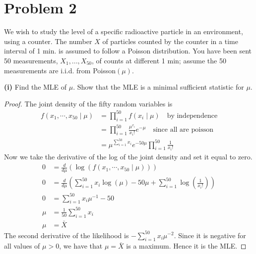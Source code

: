 \documentclass[letterpaper, 12pt]{article}\usepackage[]{graphicx}\usepackage[]{color}
\newcommand{\sbs}{\;|\;} %
\begin{document}
\section*{Problem 2} We wish to study the level of a specific radioactive particle in
an environment, using a counter. The number $X$ of particles counted by the
counter in a time interval of 1 min. is assumed to follow a Poisson
distribution. You have been sent 50 measurements, $X_{1},...,X_{50}$, of
counts at different 1 min; assume the 50 measurements are i.i.d. from
Poisson$(\mu )$.

\textbf{(i)}
Find the MLE of $\mu$. Show that the MLE is a minimal sufficient statistic for $\mu$.

\begin{proof}
The joint density of the fifty random variables is 
\begin{align*}
f(x_1, \cdots, x_{50} \sbs \mu) 
&= 
\prod_{i=1}^{50} 
f(x_i \sbs \mu) 
\quad \text{by independence} \\
&= 
\prod_{i=1}^{50}
\frac{\mu^{x_i}}{x_i!} e^{-\mu}
\quad \text{since all are poisson} \\
&= 
\mu^{\sum_{i=1}^{50} x_i} e ^{-50\mu} 
\prod_{i=1}^{50}
\frac{1}{x_i!}
\end{align*}
Now we take the derivative of the log of the joint density and set it equal to zero.
\begin{align*}
0 &= \frac{d}{d \mu}(\log (  f(x_1, \cdots, x_{50} \sbs \mu)   )) \\
0 &= 
\frac{d}{d \mu} 
\left(\sum_{i=1}^{50} x_i \log(\mu) - 50 \mu + \sum_{i=1}^{50} \log\left(\frac{1}{x_i!} \right)    \right) \\
0 &=
\sum_{i=1}^{50} x_i \mu^{-1} - 50 \\
\mu &= \frac{1}{50}\sum_{i=1}^{50} x_i \\
\mu &= \bar{X}
\end{align*}
The second derivative of the likelihood is $-\sum_{i=1}^{50} x_i \mu^{-2}$. Since it is negative for all values of $\mu > 0$, we have that $\mu = \bar{X}$ is a maximum. Hence it is the MLE.


\end{proof}
\end{document}
